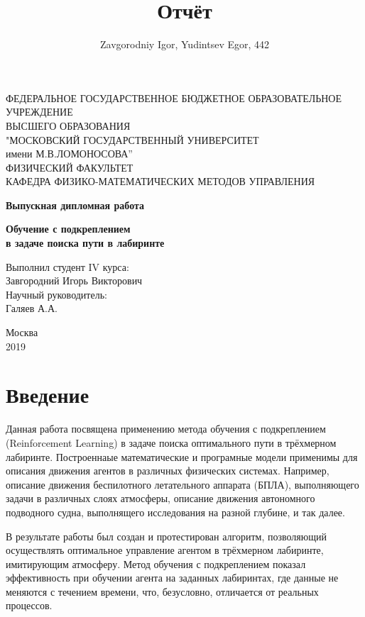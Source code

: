 \documentclass[12pt, a4paper]{report}
\author{Zavgorodniy Igor, Yudintsev Egor, 442}
\title{Отчёт}
\date{}
\theoremstyle{definition}
\theoremstyle{plain}
\theoremstyle{remark}
\theoremstyle{remark}
\theoremstyle{definition}
\begin{document}
\begin{titlepage}
  \begin{center}
    \large
   ФЕДЕРАЛЬНОЕ ГОСУДАРСТВЕННОЕ БЮДЖЕТНОЕ ОБРАЗОВАТЕЛЬНОЕ УЧРЕЖДЕНИЕ\\ ВЫСШЕГО ОБРАЗОВАНИЯ\\ "МОСКОВСКИЙ ГОСУДАРСТВЕННЫЙ УНИВЕРСИТЕТ\\ имени М.В.ЛОМОНОСОВА''\\
    ФИЗИЧЕСКИЙ ФАКУЛЬТЕТ\\КАФЕДРА ФИЗИКО-МАТЕМАТИЧЕСКИХ МЕТОДОВ УПРАВЛЕНИЯ

	\underline{\hspace{12cm}}

    \vfill

    {\LARGE \textbf{Выпускная дипломная работа}}
  	\bigskip
  	
    {\textbf{Обучение с подкреплением\\ в задаче поиска пути в лабиринте}}  	
  	\bigskip


\end{center}
\vfill

\begin{flushright}
Выполнил студент IV курса:\\
Завгородний Игорь Викторович\\
\bigskip
Научный руководитель:\\
Галяев А.А.
\end{flushright}
\vfill

\begin{center}
  Москва\\2019
\end{center}
\end{titlepage}

\newpage
\tableofcontents

\newpage
\section{Введение}
Данная работа посвящена применению метода обучения с подкреплением (Reinforcement Learning) в задаче поиска оптимального пути в трёхмерном лабиринте. Построеннаые математические и програмные модели применимы для описания движения агентов в различных физических системах. Например, описание движения беспилотного летательного аппарата (БПЛА), выполняющего задачи в различных слоях атмосферы, описание движения автономного подводного судна, выполнящего исследования на разной глубине, и так далее.

В результате работы был создан и протестирован алгоритм, позволяющий осуществлять оптимальное управление агентом в трёхмерном лабиринте, имитирующим атмосферу. Метод обучения с подкреплением показал эффективность при обучении агента на заданных лабиринтах, где данные не меняются с течением времени, что, безусловно, отличается от реальных процессов.
\end{document}
